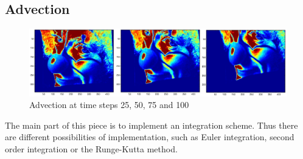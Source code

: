 \documentclass[accepted,single]{gipaper}
\begin{document}







\subsection{Advection}
\begin{center}
\begin{figure}[ht]
\includegraphics[width = \textwidth]{advect2.jpg}
\caption{Advection at time steps 25, 50, 75 and 100}
\label{advect}
\end{figure}
\end{center}

The main part of this piece is to implement an integration scheme. Thus there are different possibilities of implementation, such as Euler integration, second order integration or the Runge-Kutta method.
\end{document}
